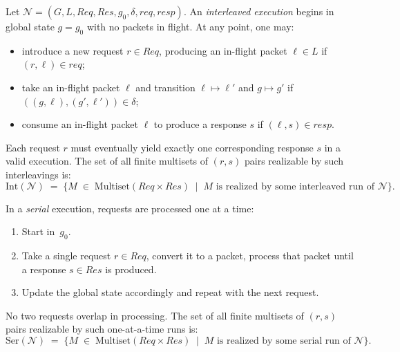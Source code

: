 \begin{definition}
    Let \(\mathcal{N} = (G, L, \mathit{Req}, \mathit{Res}, g_0, \delta, \mathit{req}, \mathit{resp})\).
    An \emph{interleaved execution} begins in global state \(g = g_0\) with no packets in flight.
    At any point, one may:
    \begin{itemize}
        \item introduce a new request \(r \in \mathit{Req}\), producing an in-flight packet \(\ell \in L\) if \((r,\ell) \in \mathit{req}\);
        \item take an in-flight packet \(\ell\) and transition \(\ell \mapsto \ell'\) and \(g \mapsto g'\) if \(((g,\ell),(g',\ell'))\in\delta\);
        \item consume an in-flight packet \(\ell\) to produce a response \(s\) if \((\ell,s)\in \mathit{resp}\).
    \end{itemize}
    Each request \(r\) must eventually yield exactly one corresponding response \(s\) in a valid execution.
    The set of all finite multisets of \((r,s)\) pairs realizable by such interleavings is:
    \[
        \mathrm{Int}(\mathcal{N})
        \;=\;
        \bigl\{
        M \;\in\; \text{Multiset}(\mathit{Req}\times \mathit{Res})
        \;\mid\;
        M \text{ is realized by some interleaved run of }\mathcal{N}
        \bigr\}.
    \]
\end{definition}

\begin{definition}
In a \emph{serial} execution, requests are processed one at a time:
\begin{enumerate}
    \item Start in \(\,g_0\).
    \item Take a single request \(r\in \mathit{Req}\), convert it to a packet, process that packet until a response \(s\in \mathit{Res}\) is produced.
    \item Update the global state accordingly and repeat with the next request.
\end{enumerate}
No two requests overlap in processing.
The set of all finite multisets of \((r,s)\) pairs realizable by such one-at-a-time runs is:
\[
    \mathrm{Ser}(\mathcal{N})
    \;=\;
    \bigl\{
    M \;\in\; \text{Multiset}(\mathit{Req}\times \mathit{Res})
    \;\mid\;
    M \text{ is realized by some serial run of }\mathcal{N}
    \bigr\}.
\]
\end{definition}

